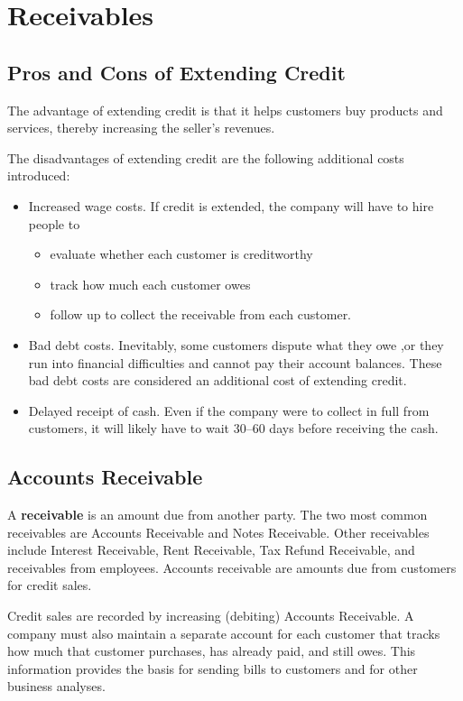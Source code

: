 \documentclass[../main.tex]{subfiles}
\begin{document}
	\section{Receivables}
	
	\subsection{Pros and Cons of Extending Credit}
	
	The advantage of extending credit is that it helps customers buy products 
	and services, thereby increasing the seller’s revenues. 
	
	The disadvantages of extending credit are the following additional costs 
	introduced:
	\begin{itemize}[noitemsep]
		\item Increased wage costs. If credit is extended, the company will 
		have to hire people to 
		\begin{itemize}[noitemsep]
			\item evaluate whether each customer is 
			creditworthy
			\item track how much each customer owes
			\item follow up to collect the receivable from each customer.
		\end{itemize}
		\item Bad debt costs. Inevitably, some customers dispute what they owe 
		,or they run into financial difficulties and cannot pay their account 
		balances. These bad debt costs are considered an additional cost of 
		extending credit.
		\item Delayed receipt of cash. Even if the company were to collect in 
		full from customers, it will likely have to wait 30–60 days before 
		receiving the cash.
	\end{itemize}
	
	\subsection{Accounts Receivable}
	
	A \textbf{receivable} is an amount due from another party. The two most 
	common receivables are Accounts Receivable and Notes Receivable. Other 
	receivables include Interest Receivable, Rent Receivable, Tax Refund 
	Receivable, and receivables from employees. Accounts receivable are amounts 
	due from customers for credit sales.
	
	Credit sales are recorded by increasing (debiting) Accounts Receivable. A 
	company must also maintain a separate account for each customer that tracks 
	how much that customer purchases, has already paid, and still owes. This 
	information provides the basis for sending bills to customers and for other 
	business analyses. 
	
\end{document}
